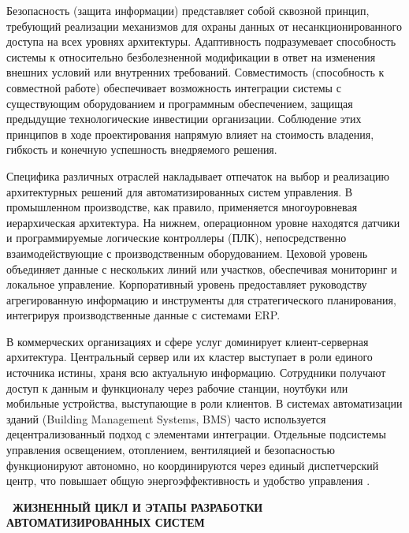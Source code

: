 \documentclass{SibFU-docs}
\begin{document}
Безопасность (защита информации) представляет собой сквозной принцип, требующий реализации механизмов для охраны данных от несанкционированного доступа на всех уровнях архитектуры. Адаптивность подразумевает способность системы к относительно безболезненной модификации в ответ на изменения внешних условий или внутренних требований. Совместимость (способность к совместной работе) обеспечивает возможность интеграции системы с существующим оборудованием и программным обеспечением, защищая предыдущие технологические инвестиции организации. Соблюдение этих принципов в ходе проектирования напрямую влияет на стоимость владения, гибкость и конечную успешность внедряемого решения.


Специфика различных отраслей накладывает отпечаток на выбор и реализацию архитектурных решений для автоматизированных систем управления. В промышленном производстве, как правило, применяется многоуровневая иерархическая архитектура. На нижнем, операционном уровне находятся датчики и программируемые логические контроллеры (ПЛК), непосредственно взаимодействующие с производственным оборудованием. Цеховой уровень объединяет данные с нескольких линий или участков, обеспечивая мониторинг и локальное управление. Корпоративный уровень предоставляет руководству агрегированную информацию и инструменты для стратегического планирования, интегрируя производственные данные с системами ERP.

В коммерческих организациях и сфере услуг доминирует клиент-серверная архитектура. Центральный сервер или их кластер выступает в роли единого источника истины, храня всю актуальную информацию. Сотрудники получают доступ к данным и функционалу через рабочие станции, ноутбуки или мобильные устройства, выступающие в роли клиентов. В системах автоматизации зданий (Building Management Systems, BMS) часто используется децентрализованный подход с элементами интеграции. Отдельные подсистемы управления освещением, отоплением, вентиляцией и безопасностью функционируют автономно, но координируются через единый диспетчерский центр, что повышает общую энергоэффективность и удобство управления \cite{rasp_control_system}.

\newpage
{}
\vspace*{-1.5em}
\begin{center}\textbf{\thesection\ ЖИЗНЕННЫЙ ЦИКЛ И ЭТАПЫ РАЗРАБОТКИ АВТОМАТИЗИРОВАННЫХ СИСТЕМ}\end{center}
\vspace*{-1.5em}
\end{document}
